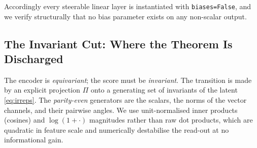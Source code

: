 \documentclass[10pt,journal]{IEEEtran}
\begin{document}
Accordingly every steerable linear layer is instantiated with \texttt{biases=False}, and we verify
structurally that no bias parameter exists on any non-scalar output.

\subsection{The Invariant Cut: Where the Theorem Is Discharged}
\label{sec:method:cut}

The encoder is \emph{equivariant}; the score must be \emph{invariant}. The transition is made by an
explicit projection $\Pi$ onto a generating set of invariants of the latent \eqref{eq:irreps}. The
\emph{parity-even} generators are the scalars, the norms of the vector channels, and their pairwise
angles. We use unit-normalised inner products (cosines) and $\log(1+\cdot)$ magnitudes rather than raw
dot products, which are quadratic in feature scale and numerically destabilise the read-out at no
informational gain.
\end{document}
